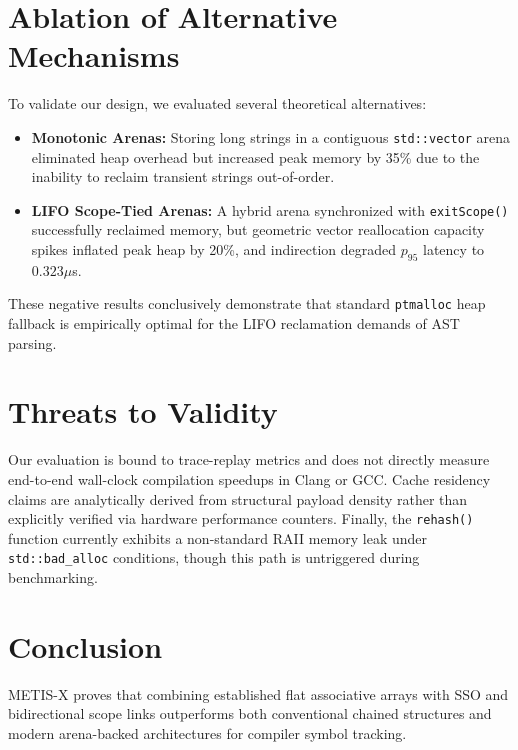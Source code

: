 \documentclass[sigconf]{acmart}
\begin{document}
\section{Ablation of Alternative Mechanisms}
To validate our design, we evaluated several theoretical alternatives:
\begin{itemize}
    \item \textbf{Monotonic Arenas:} Storing long strings in a contiguous \texttt{std::vector} arena eliminated heap overhead but increased peak memory by 35\% due to the inability to reclaim transient strings out-of-order.
    \item \textbf{LIFO Scope-Tied Arenas:} A hybrid arena synchronized with \texttt{exitScope()} successfully reclaimed memory, but geometric vector reallocation capacity spikes inflated peak heap by 20\%, and indirection degraded $p_{95}$ latency to $0.323\mu$s.
\end{itemize}
These negative results conclusively demonstrate that standard \texttt{ptmalloc} heap fallback is empirically optimal for the LIFO reclamation demands of AST parsing.

\section{Threats to Validity}
Our evaluation is bound to trace-replay metrics and does not directly measure end-to-end wall-clock compilation speedups in Clang or GCC. Cache residency claims are analytically derived from structural payload density rather than explicitly verified via hardware performance counters. Finally, the \texttt{rehash()} function currently exhibits a non-standard RAII memory leak under \texttt{std::bad\_alloc} conditions, though this path is untriggered during benchmarking.

\section{Conclusion}
METIS-X proves that combining established flat associative arrays with SSO and bidirectional scope links outperforms both conventional chained structures and modern arena-backed architectures for compiler symbol tracking. 



\end{document}
